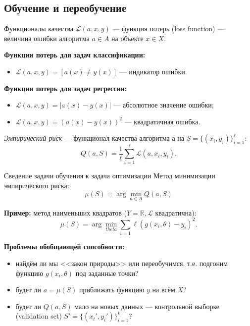 \documentclass{beamer}
\begin{document}
\subsection{Обучение и переобучение}
\begin{frame}{Функционалы качества}
$\mathscr{L}(a, x, y)$ --- функция потерь (loss function) --- величина ошибки алгоритма $a \in A$ на объекте $x \in X$.

{\bf Функции потерь для задач классификации:}
\begin{itemize}
    \item $\mathscr{L}(a, x, y) = [a(x) \ne y(x)]$ --- индикатор ошибки.
\end{itemize}

{\bf Функции потерь для задач регрессии:}
\begin{itemize}
    \item $\mathscr{L}(a, x, y) = |a(x) - y(x)|$ --- абсолютное значение ошибки;
    \item $\mathscr{L}(a, x, y) = \left(a(x) - y(x)\right)^2$ --- квадратичная ошибка.
\end{itemize}

{\it Эмпирический риск} --- функционал качества алгоритма $а$ на $S = \{(x_i, y_i)\}_{i=1}^{\ell}$:
$$
Q(a, S) = \frac{1}{\ell}\sum\limits_{i = 1}^{\ell}\mathscr{L}(a, x_i, y_i).
$$
\end{frame}

\begin{frame}{Сведение задачи обучения к задача оптимизации}
Метод минимизации эмпирического риска:
$$
\mu(S) = \arg\min_{a \in A} Q(a, S)
$$

{\bf Пример:} метод наименьших квадратов ($Y = \mathbb{R}, \mathscr{L}$ квадратична):
$$
\mu(S) = \arg\min_{theta}\sum\limits_{i=1}{\ell}\left(g(x_i, \theta) - y_i\right)^2.
$$

{\bf Проблемы обобщающей способности:}
\begin{itemize}
    \item найдём ли мы <<закон природы>> или переобучимся, т.е. подгоним функцию $g(x_i,\theta)$ под заданные точки?
    \item будет ли $a = \mu(S)$ приближать функцию $y$ на всём $X$?
    \item будет ли $Q(a, S)$ мало на новых данных --- контрольной выборке (validation set) $S' = \{(x_i', y_i')\}_{i=1}^{k}$?
\end{itemize}
\end{frame}
\end{document}
